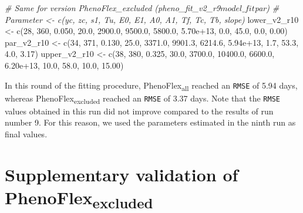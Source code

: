 \documentclass[
]{article}
\newenvironment{Shaded}{\begin{snugshade}}{\end{snugshade}}
\newcommand{\CommentTok}[1]{\textcolor[rgb]{0.56,0.35,0.01}{\textit{#1}}}
\newcommand{\DecValTok}[1]{\textcolor[rgb]{0.00,0.00,0.81}{#1}}
\newcommand{\FloatTok}[1]{\textcolor[rgb]{0.00,0.00,0.81}{#1}}
\newcommand{\FunctionTok}[1]{\textcolor[rgb]{0.00,0.00,0.00}{#1}}
\newcommand{\NormalTok}[1]{#1}
\newcommand{\OtherTok}[1]{\textcolor[rgb]{0.56,0.35,0.01}{#1}}
\begin{document}
\begin{Shaded}
\begin{Highlighting}[]
\CommentTok{\# Same for version PhenoFlex\_excluded (pheno\_fit\_v2\_r9$model\_fit$par)}
\CommentTok{\# Parameter  \textless{}{-} c(yc,  zc,    s1,   Tu,     E0,      E1,     A0,       A1,   Tf,   Tc,   Tb, slope)}
\NormalTok{lower\_v2\_r10 }\OtherTok{\textless{}{-}} \FunctionTok{c}\NormalTok{(}\DecValTok{28}\NormalTok{, }\DecValTok{360}\NormalTok{, }\FloatTok{0.050}\NormalTok{, }\FloatTok{20.0}\NormalTok{, }\FloatTok{2900.0}\NormalTok{,  }\FloatTok{9500.0}\NormalTok{, }\FloatTok{5800.0}\NormalTok{, }\FloatTok{5.70e+13}\NormalTok{,  }\FloatTok{0.0}\NormalTok{, }\FloatTok{45.0}\NormalTok{,  }\FloatTok{0.0}\NormalTok{,  }\FloatTok{0.00}\NormalTok{)}
\NormalTok{par\_v2\_r10   }\OtherTok{\textless{}{-}} \FunctionTok{c}\NormalTok{(}\DecValTok{34}\NormalTok{, }\DecValTok{371}\NormalTok{, }\FloatTok{0.130}\NormalTok{, }\FloatTok{25.0}\NormalTok{, }\FloatTok{3371.0}\NormalTok{,  }\FloatTok{9901.3}\NormalTok{, }\FloatTok{6214.6}\NormalTok{, }\FloatTok{5.94e+13}\NormalTok{,  }\FloatTok{1.7}\NormalTok{, }\FloatTok{53.3}\NormalTok{,  }\FloatTok{4.0}\NormalTok{,  }\FloatTok{3.17}\NormalTok{)}
\NormalTok{upper\_v2\_r10 }\OtherTok{\textless{}{-}} \FunctionTok{c}\NormalTok{(}\DecValTok{38}\NormalTok{, }\DecValTok{380}\NormalTok{, }\FloatTok{0.325}\NormalTok{, }\FloatTok{30.0}\NormalTok{, }\FloatTok{3700.0}\NormalTok{, }\FloatTok{10400.0}\NormalTok{, }\FloatTok{6600.0}\NormalTok{, }\FloatTok{6.20e+13}\NormalTok{, }\FloatTok{10.0}\NormalTok{, }\FloatTok{58.0}\NormalTok{, }\FloatTok{10.0}\NormalTok{, }\FloatTok{15.00}\NormalTok{)}
\end{Highlighting}
\end{Shaded}

In this round of the fitting procedure, PhenoFlex\textsubscript{all}
reached an \texttt{RMSE} of 5.94 days, whereas
PhenoFlex\textsubscript{excluded} reached an \texttt{RMSE} of 3.37 days.
Note that the \texttt{RMSE} values obtained in this run did not improve
compared to the results of run number 9. For this reason, we used the
parameters estimated in the ninth run as final values.

\hypertarget{supplementary-validation-of-phenoflex}{%
\section{\texorpdfstring{Supplementary validation of
PhenoFlex\textsubscript{excluded}}{Supplementary validation of PhenoFlex}}\label{supplementary-validation-of-phenoflex}}
\end{document}
